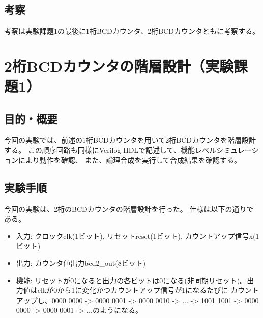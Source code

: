 \documentclass[uplatex]{jsarticle}
\begin{document}
\subsection{考察}

考察は実験課題1の最後に1桁BCDカウンタ、2桁BCDカウンタともに考察する。

\clearpage

\section{2桁BCDカウンタの階層設計（実験課題1）}

\subsection{目的・概要}

今回の実験では、前述の1桁BCDカウンタを用いて2桁BCDカウンタを階層設計する。
この順序回路も同様にVerilog HDLで記述して、機能レベルシミュレーションにより動作を確認、
また、論理合成を実行して合成結果を確認する。

\subsection{実験手順}

今回の実験は、2桁のBCDカウンタの階層設計を行った。
仕様は以下の通りである。

\begin{itemize}
  \item 入力: クロックclk(1ビット), リセットreset(1ビット), カウントアップ信号x(1ビット)
  \item 出力: カウンタ値出力bcd2_out(8ビット)
  \item 機能: リセットが0になると出力の各ビットは0になる(非同期リセット)。出力値はclkが0から1に変化かつカウントアップ信号が1になるたびに
	         カウントアップし、0000 0000 -> 0000 0001 -> 0000 0010 -> ... -> 1001 1001 -> 0000 0000 -> 0000 0001 -> ...のようになる。
\end{itemize}
\end{document}
